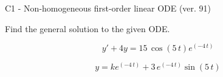 \begin{exercise}
  \begin{exerciseTitle}C1 - Non-homogeneous first-order linear ODE (ver. 91)\end{exerciseTitle}
  \begin{exerciseStatement}
    
Find the general solution to the given ODE.

    
\[y'+4y= 15 \, \cos\left(5 \, t\right) e^{\left(-4 \, t\right)}\]

  \end{exerciseStatement}
  \begin{exerciseAnswer}
    
\[y= k e^{\left(-4 \, t\right)} + 3 \, e^{\left(-4 \, t\right)} \sin\left(5 \, t\right)\]

  \end{exerciseAnswer}
\end{exercise}
